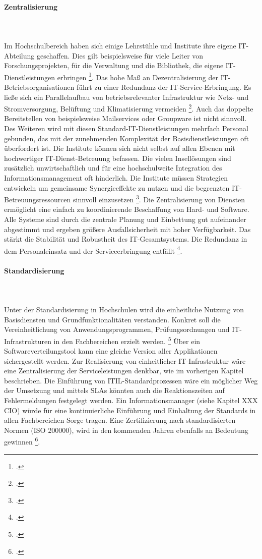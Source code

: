 \paragraph{Zentralisierung}\mbox{}\\\\
Im Hochschulbereich haben sich einige Lehrstühle und Institute ihre eigene IT-Abteilung geschaffen. Dies gilt beispielsweise für viele Leiter von Forschungsprojekten, für die Verwaltung und die Bibliothek, die eigene IT-Dienstleistungen erbringen \footcite{Zitat fehlt}. Das hohe Maß an Dezentralisierung der IT-Betriebsorganisationen führt zu einer Redundanz der IT-Service-Erbringung. Es ließe sich ein Parallelaufbau von betriebsrelevanter Infrastruktur wie Netz- und Stromversorgung, Belüftung und Klimatisierung vermeiden \footcite{Zitat fehlt}. Auch das doppelte Bereitstellen von beispielsweise Mailservices oder Groupware ist nicht sinnvoll. Des Weiteren wird mit diesen Standard-IT-Dienstleistungen mehrfach Personal gebunden, das mit der zunehmenden Komplexität der Basisdienstleistungen oft überfordert ist. 
Die Institute können sich nicht selbst auf allen Ebenen mit hochwertiger IT-Dienst-Betreuung befassen. Die vielen Insellösungen sind zusätzlich unwirtschaftlich und für eine hochschulweite Integration des Informationsmanagement oft hinderlich. Die Institute müssen Strategien entwickeln um gemeinsame Synergieeffekte zu nutzen und die begrenzten IT-Betreuungsressourcen sinnvoll einzusetzen \footcite{Zitat fehlt}.
Die Zentralisierung von Diensten ermöglicht eine einfach zu koordinierende Beschaffung von Hard- und Software. Alle Systeme sind durch die zentrale Planung und Einbettung gut aufeinander abgestimmt und ergeben größere Ausfallsicherheit mit hoher Verfügbarkeit. Das stärkt die Stabilität und Robustheit des IT-Gesamtsystems. Die Redundanz in dem Personaleinsatz und der Serviceerbringung entfällt \footcite{Zitat fehlt}. 


\paragraph{Standardisierung}\mbox{}\\\\
Unter der Standardisierung in Hochschulen wird die einheitliche Nutzung von Basisdiensten und Grundfunktionalitäten verstanden. Konkret soll die Vereinheitlichung von Anwendungsprogrammen, Prüfungsordnungen und IT-Infrastrukturen in den Fachbereichen erzielt werden. \footcite{Zitat fehlt}
Über ein Softwareverteilungstool kann eine gleiche Version aller Applikationen sichergestellt werden. Zur Realisierung von einheitlicher IT-Infrastruktur wäre eine Zentralisierung der Serviceleistungen denkbar, wie im vorherigen Kapitel beschrieben. Die Einführung von ITIL-Standardprozessen wäre ein möglicher Weg der Umsetzung und mittels SLAs könnten auch die Reaktionszeiten auf Fehlermeldungen festgelegt werden. Ein Informationsmanager (siehe Kapitel XXX CIO) würde für eine kontinuierliche Einführung und Einhaltung der Standards in allen Fachbereichen Sorge tragen. Eine Zertifizierung nach standardisierten Normen (ISO 200000), wird in den kommenden Jahren ebenfalls an Bedeutung gewinnen \footcite{Zitat fehlt}.


